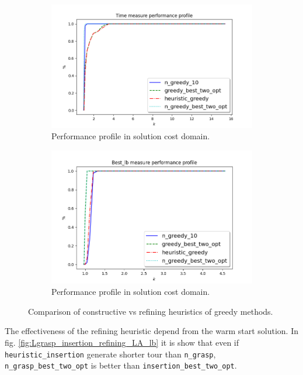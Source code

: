\begin{figure}
	\centering
	\begin{subfigure}{.8\textwidth}
		\centering
		\includegraphics[width=\columnwidth]{../res/Lgreedy_refining_LA_time.png}
		\caption{Performance profile in solution cost domain.}
		\label{fig:Lgreedy_refining_LA_time}
	\end{subfigure}
	\begin{subfigure}{.8\textwidth}
		\centering
		\includegraphics[width=\columnwidth]{../res/Lgreedy_refining_LA_lb.png}
		\caption{Performance profile in solution cost domain.}
		\label{fig:Lgreedy_refining_LA_lb}
	\end{subfigure}
	\caption{Comparison of constructive vs refining heuristics of greedy methods.}
	\label{fig:pp_Lgreedy_refining}
\end{figure}


The effectiveness of the refining heuristic depend from the warm start solution. In fig. \ref{fig:Lgrasp_insertion_refining_LA_lb} it is show that even if \texttt{heuristic\_insertion} generate shorter tour than \texttt{n\_grasp}, \texttt{n\_grasp\_best\_two\_opt} is better than \texttt{insertion\_best\_two\_opt}.

